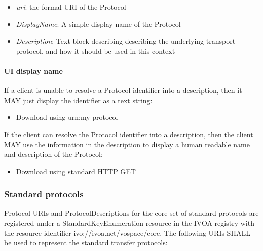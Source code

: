 \documentclass[11pt,a4paper]{ivoa}
\begin{document}
\begin{itemize}
    \item \emph{uri}: the formal URI of the Protocol
    \item \emph{DisplayName}: A simple display name of the Protocol
    \item \emph{Description}: Text block describing describing the underlying transport protocol, and how it should be used in this context
\end{itemize}

\paragraph{UI display name}

If a client is unable to resolve a Protocol identifier into a description, then it MAY just display the identifier as a text string:

\begin{itemize}
    \item Download using urn:my-protocol
\end{itemize}

If the client can resolve the Protocol identifier into a description, then the client MAY use the information in the description to display a human readable name and description of the Protocol:

\begin{itemize}
    \item Download using standard HTTP GET
\end{itemize}

\subsubsection{Standard protocols}
\label{subsubsec:standard protocols}
Protocol URIs and ProtocolDescriptions for the core set of standard protocols are registered under a StandardKeyEnumeration resource \citep{std:STDREGEXT} in the IVOA registry with the resource identifier ivo://ivoa.net/vospace/core. The following URIs SHALL be used to represent the standard transfer protocols:
\end{document}
